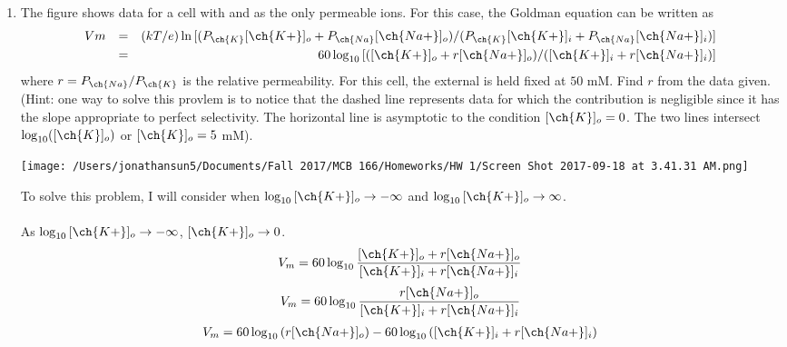 \documentclass[11pt]{article}
\begin{document}
\begin{enumerate}[label=\arabic*.]
\newpage
\item
The figure shows data for a cell with  and  as the only permeable ions. For this case, the Goldman equation can be written as \\
\begin{align*}
Vm && = && (kT/e) \ln{[(P_{\ch{K}}[\ch{K+}]_o + P_{\ch{Na}}[\ch{Na+}]_o) / (P_{\ch{K}}[\ch{K+}]_i + P_{\ch{Na}}[\ch{Na+}]_i)]} \\
&& = && 60\log_{10}{[([\ch{K+}]_o + r[\ch{Na+}]_o) / ([\ch{K+}]_i + r[\ch{Na+}]_i)]}
\end{align*}
where $r = P_{\ch{Na}} / P_{\ch{K}}$ is the relative permeability. For this cell, the external  is held fixed at $50$ mM. Find $r$ from the data given. (Hint: one way to solve this provlem is to notice that the dashed line represents data for which the  contribution is negligible since it has the slope appropriate to perfect  selectivity. The horizontal line is asymptotic to the condition $[\ch{K}]_o = 0$. The two lines intersect $\log_{10}([\ch{K}]_o)$ or $[\ch{K}]_o = 5$ mM).
\begin{center}
\texttt{[image: /Users/jonathansun5/Documents/Fall 2017/MCB 166/Homeworks/HW 1/Screen Shot 2017-09-18 at 3.41.31 AM.png]}
\end{center}
To solve this problem, I will consider when $\log_{10}{[\ch{K+}]_o} \to -\infty$ and $\log_{10}{[\ch{K+}]_o} \to \infty$.
\vspace*{1\baselineskip}
\\
 \\
As $\log_{10}{[\ch{K+}]_o} \to -\infty$, $[\ch{K+}]_o \to 0$.
\begin{align*}
V_m = 60\log_{10}{\frac{[\ch{K+}]_o + r[\ch{Na+}]_o} {[\ch{K+}]_i + r[\ch{Na+}]_i}}
\end{align*}
\begin{align*}
V_m = 60\log_{10}{\frac{r[\ch{Na+}]_o} {[\ch{K+}]_i + r[\ch{Na+}]_i}}
\end{align*}
\begin{align*}
V_m = 60\log_{10}{(r[\ch{Na+}]_o)} - 60\log_{10}{([\ch{K+}]_i + r[\ch{Na+}]_i)}
\end{align*}


\end{enumerate}
\end{document}
